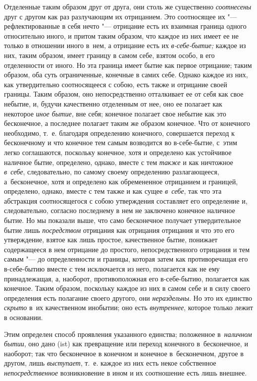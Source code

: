 Отделенные таким образом друг от друга, они столь же существенно
{\em соотнесены} друг с другом как раз разлучающим их отрицанием. Это
соотносящее их "--- рефлектированные в себя нечто "--- отрицание есть их
взаимная граница одного относительно иного, и притом таким образом, что каждое
из них имеет ее не только в отношении иного в~нем, а отрицание есть их
{\em в-себе-бытие;} каждое из них, таким образом, имеет границу в самом себе,
взятом особо, в его отделенности от иного. Но эта граница имеет бытие как
первое отрицание; таким образом, оба суть ограниченные, конечные в самих себе.
Однако каждое из них, как утвердительно соотносящееся с собою, есть также и
отрицание своей границы. Таким образом, оно непосредственно отталкивает ее от
себя как свое небытие, и, будучи качественно отделенным от нее, оно ее полагает
как некоторое {\em иное бытие}, вне себя; конечное полагает свое небытие как
это бесконечное, а последнее полагает таким же образом конечное. Что от
конечного необходимо, т.~е. благодаря определению конечного, совершается
переход к бесконечному и что конечное тем самым возводится во в-себе-бытие,
с~этим легко соглашаются, поскольку конечное, хотя и определено как устойчивое
наличное бытие, определено, однако, вместе с тем {\em также} и как ничтожное
{\em в~себе}, следовательно, по самому своему определению разлагающееся,
а~бесконечное, хотя и определено как обремененное отрицанием и границей,
определено, однако, вместе с тем также и как сущее {\em в~себе}, так что эта
абстракция соотносящегося с собою утверждения составляет его определение и,
следовательно, согласно последнему в нем не заключено конечное наличное бытие.
Но мы показали выше, что само бесконечное получает утвердительное бытие лишь
{\em посредством} отрицания как отрицания отрицания и что это его утверждение,
взятое как лишь простое, качественное бытие, понижает содержащееся в нем
отрицание до простого, непосредственного отрицания и тем самым "--- до
определенности и границы, которая затем как противоречащая его в-себе-бытию
вместе с тем исключается из него, полагается как не ему принадлежащая, а,
наоборот, противоположная его в-себе-бытию, полагается как конечное. Таким
образом, поскольку каждое из них в самом себе и в силу своего определения есть
полагание своего другого, они {\em нераздельны}. Но это их единство
{\em скрыто} в~их качественном инобытии; оно есть {\em внутреннее}, которое
только лежит в основании.

Этим определен способ проявления указанного единства; положенное
в~{\em наличном бытии}, оно дано (ist) как превращение или переход конечного
в~бесконечное, и наоборот; так что бесконечное в конечном и конечное
в~бесконечном, другое в другом, лишь {\em выступает}, т.~е. каждое из них есть
некое собственное {\em непосредственное} возникновение в ином и их соотношение
есть лишь внешнее.

